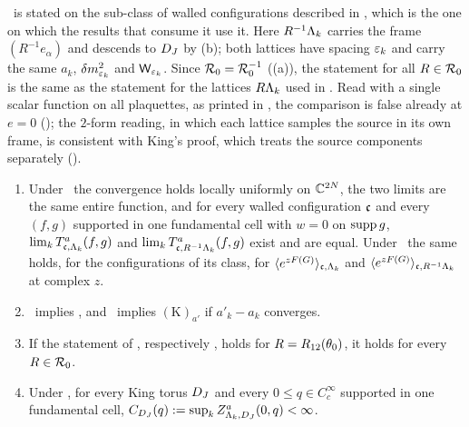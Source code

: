 \Kz\ is stated on the sub-class of walled configurations described in , which is the one on which the results that consume it use it. Here $R^{-1}\Lambda_k$ carries the frame $(R^{-1}e_\alpha)$ and descends to $D_J$ by (b); both lattices have spacing $\varepsilon_k$ and carry the same $a_k$, $\delta m^2_{\varepsilon_k}$ and $\mathsf W_{\varepsilon_k}$. Since $\mathcal R_0=\mathcal R_0^{-1}$ ((a)), the statement for all $R\in\mathcal R_0$ is the same as the statement for the lattices $R\Lambda_k$ used in \cite{K2}. Read with a single scalar function on all plaquettes, as printed in \cite[(2.12), Thm.~2.4]{K2}, the comparison is false already at $e=0$ (); the $2$-form reading, in which each lattice samples the source in its own frame, is consistent with King's proof, which treats the source components separately ().

\begin{lemma}\label{rot:lem:K}
\begin{enumerate}[label=\textup{(\alph*)},nosep]
\item Under \Ka\ the convergence holds locally uniformly on $\mathbb C^{2N}$, the two limits are the same entire function, and for every walled configuration $\mathfrak c$ and every $(f,g)$ supported in one fundamental cell with $w=0$ on $\operatorname{supp} g$, $\lim_kT^{a}_{\mathfrak c,\Lambda_k}(f,g)$ and $\lim_kT^{a}_{\mathfrak c,R^{-1}\Lambda_k}(f,g)$ exist and are equal. Under \Kz\ the same holds, for the configurations of its class, for $\langle e^{zF(G)}\rangle_{\mathfrak c,\Lambda_k}$ and $\langle e^{zF(G)}\rangle_{\mathfrak c,R^{-1}\Lambda_k}$ at complex $z$.
\item \Ka\ implies \Kz, and \Ka\ implies $(\mathrm K)_{a'}$ if $a'_k-a_k$ converges.
\item If the statement of \Ka, respectively \Kz, holds for $R=R_{12}(\theta_0)$, it holds for every $R\in\mathcal R_0$.
\item Under \Ka, for every King torus $D_J$ and every $0\le q\in C^\infty_c$ supported in one fundamental cell, $C_{D_J}(q):=\sup_kZ^a_{\Lambda_k,D_J}(0,q)<\infty$.
\end{enumerate}
\end{lemma}

